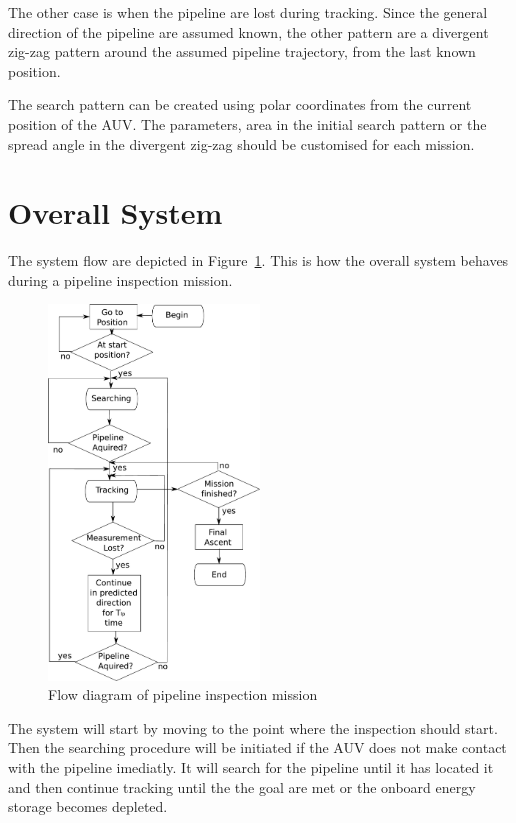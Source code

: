 		The other case is when the pipeline are lost during tracking. Since the general direction of
		the pipeline are assumed known, the other pattern are a divergent zig-zag pattern around the
		assumed pipeline trajectory, from the last known position.

		The search pattern can be created using polar coordinates from the current position of the
		AUV. The parameters, area in the initial search pattern or the spread angle in the divergent 
		zig-zag should be customised for each mission.

	
\section{Overall System}
	The system flow are depicted in Figure~\ref{fig:ch2-flowdiagram}. This is how the overall system behaves
	during a pipeline inspection mission. 
	\begin{figure}[htbp]
		\centering
		\includegraphics[width=0.5\textwidth]{pics/Operation}
		\caption{Flow diagram of pipeline inspection mission}
		\label{fig:ch2-flowdiagram}
	\end{figure}
	The system will start by moving to the point where the inspection should start. Then the searching
	procedure will be initiated if the AUV does not make contact with the pipeline imediatly. It will
	search for the pipeline until it has located it and then continue tracking until the the goal are met
	or the onboard energy storage becomes depleted. 

